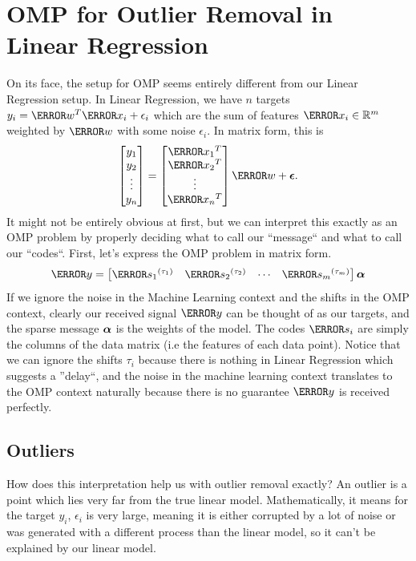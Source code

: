   \section{OMP for Outlier Removal in Linear Regression}
  On its face, the setup for OMP seems entirely different from our Linear Regression setup.
  In Linear Regression, we have $n$ targets $y_i = \V{w}^T\V{x_i}+\epsilon_i$ which are the sum of features $\V{x_i}\in\mathbb{R}^m$ weighted by $\V{w}$ with some noise $\epsilon_i$.
  In matrix form, this is
  \[
	\begin{bmatrix}
	  y_1\\y_2\\\vdots\\y_n
	\end{bmatrix} = \begin{bmatrix}
	  \V{x_1}^T\\\V{x_2}^T\\\vdots\\\V{x_n}^T
	\end{bmatrix}\V{w} + \bs{\epsilon}.
  \]
  It might not be entirely obvious at first, but we can interpret this exactly as an OMP problem by properly deciding what to call our ``message`` and what to call our ``codes``.
  First, let's express the OMP problem in matrix form.
  \[
	\V{y} = \begin{bmatrix}
	  \V{s_1}^{(\tau_1)} & \V{s_2}^{(\tau_2)} & \cdots & \V{s_m}^{(\tau_m)}
	\end{bmatrix}\bs{\alpha}
  \]
  If we ignore the noise in the Machine Learning context and the shifts in the OMP context, clearly our received signal $\V{y}$ can be thought of as our targets, and the sparse message $\boldsymbol{\alpha}$ is the weights of the model.
  The codes $\V{s_i}$ are simply the columns of the data matrix (i.e the features of each data point). Notice that we can ignore the shifts $\tau_i$ because there is nothing in Linear Regression which suggests a ''delay``, and the noise in the machine learning context translates to the OMP context naturally because there is no guarantee $\V{y}$ is received perfectly.
  \subsection{Outliers}
  How does this interpretation help us with outlier removal exactly?
  An outlier is a point which lies very far from the true linear model.
  Mathematically, it means for the target $y_i$, $\epsilon_i$ is very large, meaning it is either corrupted by a lot of noise or was generated with a different process than the linear model, so it can't be explained by our linear model.

